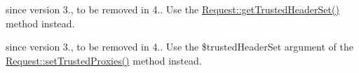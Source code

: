 
\begin{DoxyRefList}
\item[\label{deprecated__deprecated000002}%
\Hypertarget{deprecated__deprecated000002}%
Member \mbox{\hyperlink{class_illuminate_1_1_support_1_1_facades_1_1_request_a55370a6f7198b65ee1ab0f8416f4fb40}{Illuminate\+:\+:get\+Trusted\+Header\+Name}} (\$key)]since version 3., to be removed in 4.. Use the \mbox{\hyperlink{class_illuminate_1_1_support_1_1_facades_1_1_request_ae3ef3d27cc0d73a108b3f97e4568bd76}{Request\+::get\+Trusted\+Header\+Set()}} method instead.


\item[\label{deprecated__deprecated000001}%
\Hypertarget{deprecated__deprecated000001}%
Member \mbox{\hyperlink{class_illuminate_1_1_support_1_1_facades_1_1_request_abbd0aa91652f2122be7a351876da3468}{Illuminate\+:\+:set\+Trusted\+Header\+Name}} (\$key, \$value)]since version 3., to be removed in 4.. Use the \$trusted\+Header\+Set argument of the \mbox{\hyperlink{class_illuminate_1_1_support_1_1_facades_1_1_request_a1686fbcf12f72ed06a19adf0633054fa}{Request\+::set\+Trusted\+Proxies()}} method instead.


\end{DoxyRefList}